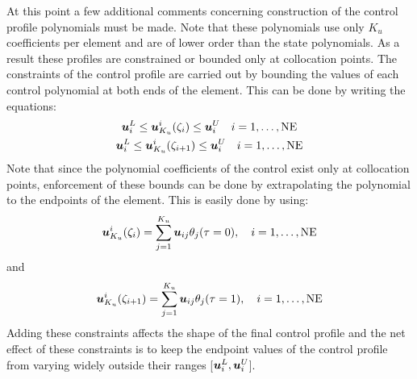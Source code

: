 At this point a few additional comments concerning construction of the
control profile polynomials must be made. Note that these
polynomials use only $K_{u}$ coefficients per element and are of lower
order than the state polynomials. As a result these profiles are
constrained or bounded only at collocation points. The constraints of
the control profile are carried out by bounding the values of each
control polynomial at both ends of the element. This can be done by
writing the equations: 
\begin{gather}
\ve{u}_{i}^{L} \leq \ve{u}_{K_{u}}^{i}(\zeta_{i}) \leq
\ve{u}_{i}^{U} \quad i=1,\ldots,\textrm{NE}\\
\ve{u}_{i}^{L}\leq \ve{u}_{K_{u}}^{i}(\zeta_{i+1}) \leq
\ve{u}_{i}^{U} \quad i=1,\ldots,\textrm{NE}
\end{gather}
Note that since the polynomial coefficients of the control exist only
at collocation points, enforcement of these bounds can be done by
extrapolating the polynomial to the endpoints of the element. This is
easily done by using:
\begin{equation}
{\ve{u}_{K_{u}}^{i}}(\zeta_{i}) = \sum_{j=1}^{K_{u}}{\ve{u}_{ij}\theta_{j}}(\tau=0),
\quad i=1,\ldots,\textrm{NE} 
\end{equation}
and
\begin{equation}
{\ve{u}_{K_{u}}^{i}}(\zeta_{i+1}) = \sum_{j=1}^{K_{u}}{\ve{u}_{ij}\theta_{j}}(\tau=1),
\quad i=1,\ldots,\textrm{NE} 
\end{equation}
Adding these constraints affects the shape of the final control
profile and the net effect of these constraints is to keep the
endpoint values of the control profile from varying widely outside
their ranges [$\ve{u}_{i}^{L},\ve{u}_{i}^{U}$].


